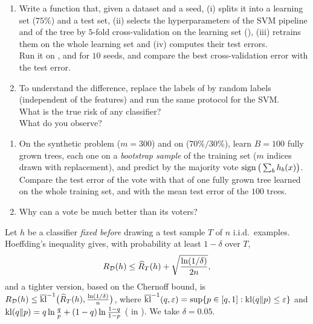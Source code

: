 \documentclass[a4paper,11pt]{article}
\begin{document}
\label{p1:protocol}

\begin{enumerate}
\item Write a function that, given a dataset and a seed, (i) splits it into a learning set ($75\%$) and a test set,
      (ii) selects the hyperparameters of the SVM pipeline and of the tree by $5$-fold cross-validation on the learning
      set (), (iii) retrains them on the whole learning set and (iv) computes their test errors.\\
      Run it on ,  and  for $10$ seeds, and compare the best cross-validation
      error with the test error.
\item To understand the difference, replace the labels of  by random labels (independent of the features)
      and run the same protocol for the SVM.\\
      What is the true risk of any classifier?\\
      What do you observe?
\end{enumerate}

\label{p1:ens}

\begin{enumerate}
\item On the synthetic problem ($m=300$) and on  ($70\%/30\%$), learn $B=100$ fully grown trees, each one on a
      \emph{bootstrap sample} of the training set ($m$ indices drawn with replacement), and predict by the majority vote
      $\operatorname{sign}\big(\sum_{b}h_b(x)\big)$.\\
      Compare the test error of the vote with that of one fully grown tree learned on the
      whole training set, and with the mean test error of the $100$ trees.
\item Why can a vote be much better than its voters?
\end{enumerate}

\label{p1:bounds}

Let $h$ be a classifier \emph{fixed before} drawing a test sample $T$ of $n$ i.i.d.\ examples. Hoeffding's inequality
gives, with probability at least $1-\delta$ over $T$,
\[
R_{\mathcal{D}}(h)\leq\widehat R_T(h)+\sqrt{\frac{\ln(1/\delta)}{2n}} ,
\]
and a tighter version, based on the Chernoff bound, is $R_{\mathcal{D}}(h)\leq\overline{\operatorname{kl}}^{-1}\big(\widehat R_T(h),\frac{\ln(1/\delta)}{n}\big)$,
where $\overline{\operatorname{kl}}^{-1}(q,\varepsilon)=\sup\{p\in[q,1]:\operatorname{kl}(q\|p)\leq\varepsilon\}$ and $\operatorname{kl}(q\|p)=q\ln\frac qp+(1-q)\ln\frac{1-q}{1-p}$
( in ). We take $\delta=0.05$.
\end{document}
